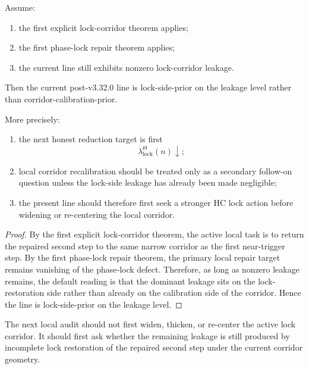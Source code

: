 \begin{theorem}
\label{thm:first-lock-corridor-leakage-orientation-theorem}
Assume:
\begin{enumerate}[leftmargin=2em,label=(\alph*)]
  \item the first explicit lock-corridor theorem applies;
  \item the first phase-lock repair theorem applies;
  \item the current line still exhibits nonzero lock-corridor leakage.
\end{enumerate}
Then the current post-v3.32.0 line is lock-side-prior on the leakage level rather than corridor-calibration-prior.

More precisely:
\begin{enumerate}[leftmargin=2em,label=(\roman*)]
  \item the next honest reduction target is first
  \[
    \lambda_{\mathrm{lock}}^{\Theta}(n)\downarrow;
  \]
  \item local corridor recalibration should be treated only as a secondary follow-on question unless the lock-side leakage has already been made negligible;
  \item the present line should therefore first seek a stronger HC lock action before widening or re-centering the local corridor.
\end{enumerate}
\end{theorem}

\begin{proof}
By the first explicit lock-corridor theorem, the active local task is to return the repaired second step to the same narrow corridor as the first near-trigger step. By the first phase-lock repair theorem, the primary local repair target remains vanishing of the phase-lock defect. Therefore, as long as nonzero leakage remains, the default reading is that the dominant leakage sits on the lock-restoration side rather than already on the calibration side of the corridor. Hence the line is lock-side-prior on the leakage level.
\end{proof}

\begin{corollary}
\label{cor:current-leakage-working-rule}
The next local audit should not first widen, thicken, or re-center the active lock corridor. It should first ask whether the remaining leakage is still produced by incomplete lock restoration of the repaired second step under the current corridor geometry.
\end{corollary}

